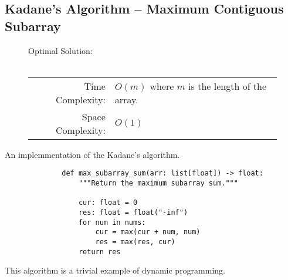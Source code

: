 
\subsection{Kadane's Algorithm -- Maximum Contiguous Subarray}

\begin{figure}[H]
    Optimal Solution:\\\\
    \begin{tabular}{rl}
        Time Complexity:& \(O(m)\) where \(m\) is the length of the array.\\
        Space Complexity:& \(O(1)\)
    \end{tabular}
\end{figure}

An implemmentation of the Kadane's algorithm.

\begin{figure}[H]
    \centering
    \begin{verbatim}
        def max_subarray_sum(arr: list[float]) -> float:
            """Return the maximum subarray sum."""

            cur: float = 0
            res: float = float("-inf")
            for num in nums:
                cur = max(cur + num, num)
                res = max(res, cur)
            return res
    \end{verbatim}
\end{figure}

This algorithm is a trivial example of dynamic programming.
